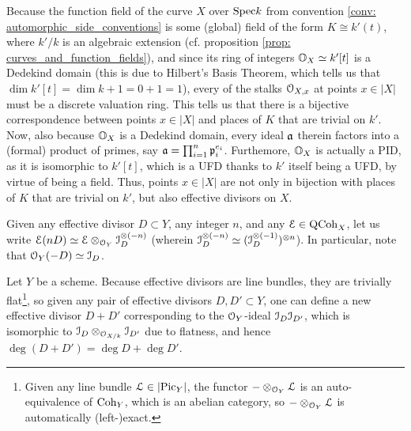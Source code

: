             \begin{remark} 
                Because the function field of the curve $X$ over $\mathrm{Spec} k$ from convention \ref{conv: automorphic_side_conventions} is some (global) field of the form $K \cong k'(t)$, where $k'/k$ is an algebraic extension (cf. proposition \ref{prop: curves_and_function_fields}), and since its ring of integers $\mathbb{O}_X \simeq k'[t]$ is a Dedekind domain (this is due to Hilbert's Basis Theorem, which tells us that $\dim k'[t] = \dim k + 1 = 0 + 1 = 1$), every of the stalks $\mathcal{O}_{X, x}$ at points $x \in |X|$ must be a discrete valuation ring. This tells us that there is a bijective correspondence between points $x \in |X|$ and places of $K$ that are trivial on $k'$. Now, also because $\mathbb{O}_X$ is a Dedekind domain, every ideal $\mathfrak{a}$ therein factors into a (formal) product of primes, say $\mathfrak{a} = \prod_{i = 1}^n \mathfrak{p}_i^{e_i}$. Furthemore, $\mathbb{O}_X$ is actually a PID, as it is isomorphic to $k'[t]$, which is a UFD thanks to $k'$ itself being a UFD, by virtue of being a field. Thus, points $x \in |X|$ are not only in bijection with places of $K$ that are trivial on $k'$, but also effective divisors on $X$.
            \end{remark}
            
            \begin{convention}
                Given any effective divisor $D \subset Y$, any integer $n$, and any $\mathcal{E} \in \mathrm{QCoh}_X$, let us write $\E(nD) \cong \E \tensor_{\calO_Y} \calI_D^{\tensor (-n)}$ (wherein $\calI_D^{\tensor (-n)} \cong (\calI_D^{\tensor (-1)})^{\tensor n}$). In particular, note that $\mathcal{O}_Y(-D) \simeq \mathcal{I}_D$.
            \end{convention}
            \begin{remark} \label{remark: adding_effective_divisors}
                Let $Y$ be a scheme. Because effective divisors are line bundles, they are trivially flat\footnote{Given any line bundle $\mathcal{L} \in |\mathrm{Pic}_Y|$, the functor $- \tensor_{\calO_Y} \calL$ is an auto-equivalence of $\mathrm{Coh}_Y$, which is an abelian category, so $- \tensor_{\calO_Y} \calL$ is automatically (left-)exact.}, so given any pair of effective divisors $D, D' \subset Y$, one can define a new effective divisor $D + D'$ corresponding to the $\mathcal{O}_Y$-ideal $\mathcal{I}_D \mathcal{I}_{D'}$, which is isomorphic to $\calI_D \tensor_{\calO_{X/k}} \calI_{D'}$ due to flatness, and hence $\deg(D + D') = \deg D + \deg D'$.
            \end{remark}
            
